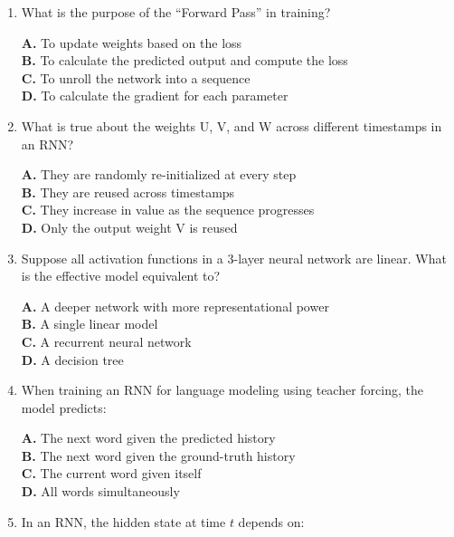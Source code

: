 \documentclass[11pt]{article}
\begin{document}
\begin{enumerate}[label=Q\arabic*., leftmargin=*]
\textbf{A.} They cannot use embeddings\\
\textbf{B.} They assume fixed input size and struggle with temporal order\\
\textbf{C.} They cannot be trained with gradient descent\\
\textbf{D.} They do not use activation functions

\item What is the purpose of the ``Forward Pass'' in training?

\textbf{A.} To update weights based on the loss\\
\textbf{B.} To calculate the predicted output and compute the loss\\
\textbf{C.} To unroll the network into a sequence\\
\textbf{D.} To calculate the gradient for each parameter

\item What is true about the weights U, V, and W across different timestamps in an RNN?

\textbf{A.} They are randomly re-initialized at every step\\
\textbf{B.} They are reused across timestamps\\
\textbf{C.} They increase in value as the sequence progresses\\
\textbf{D.} Only the output weight V is reused

\item Suppose all activation functions in a 3-layer neural network are linear. What is the effective model equivalent to?

\textbf{A.} A deeper network with more representational power\\
\textbf{B.} A single linear model\\
\textbf{C.} A recurrent neural network\\
\textbf{D.} A decision tree

\item When training an RNN for language modeling using teacher forcing, the model predicts:

\textbf{A.} The next word given the predicted history\\
\textbf{B.} The next word given the ground-truth history\\
\textbf{C.} The current word given itself\\
\textbf{D.} All words simultaneously

\item In an RNN, the hidden state at time $t$ depends on:


\end{enumerate}
\end{document}
